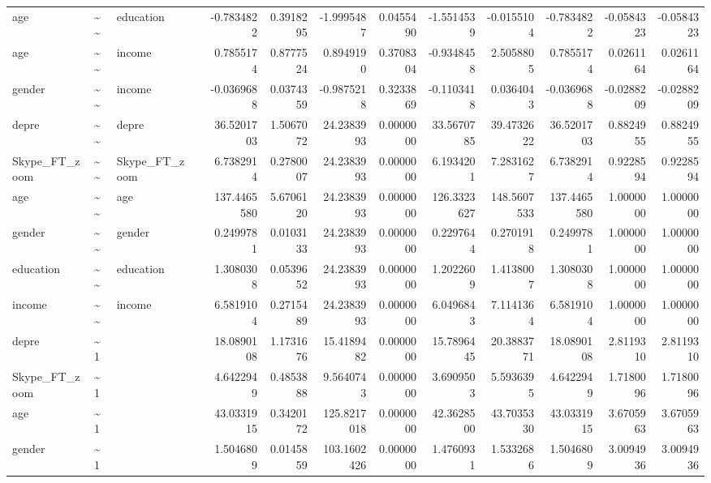 \documentclass[
]{article}
\begin{document}
\begin{table}[!h]
\begin{tabular}[t]{llllrrrrrrrrr}
age & \textasciitilde{}\textasciitilde{} & education &  & -0.7834822 & 0.3918295 & -1.9995487 & 0.0455490 & -1.5514539 & -0.0155104 & -0.7834822 & -0.0584323 & -0.0584323\\
age & \textasciitilde{}\textasciitilde{} & income &  & 0.7855174 & 0.8777524 & 0.8949190 & 0.3708304 & -0.9348458 & 2.5058805 & 0.7855174 & 0.0261164 & 0.0261164\\
gender & \textasciitilde{}\textasciitilde{} & income &  & -0.0369688 & 0.0374359 & -0.9875218 & 0.3233869 & -0.1103418 & 0.0364043 & -0.0369688 & -0.0288209 & -0.0288209\\
\addlinespace
depre & \textasciitilde{}\textasciitilde{} & depre &  & 36.5201703 & 1.5067072 & 24.2383993 & 0.0000000 & 33.5670785 & 39.4732622 & 36.5201703 & 0.8824955 & 0.8824955\\
Skype\_FT\_zoom & \textasciitilde{}\textasciitilde{} & Skype\_FT\_zoom &  & 6.7382914 & 0.2780007 & 24.2383993 & 0.0000000 & 6.1934201 & 7.2831627 & 6.7382914 & 0.9228594 & 0.9228594\\
age & \textasciitilde{}\textasciitilde{} & age &  & 137.4465580 & 5.6706120 & 24.2383993 & 0.0000000 & 126.3323627 & 148.5607533 & 137.4465580 & 1.0000000 & 1.0000000\\
gender & \textasciitilde{}\textasciitilde{} & gender &  & 0.2499781 & 0.0103133 & 24.2383993 & 0.0000000 & 0.2297644 & 0.2701918 & 0.2499781 & 1.0000000 & 1.0000000\\
education & \textasciitilde{}\textasciitilde{} & education &  & 1.3080308 & 0.0539652 & 24.2383993 & 0.0000000 & 1.2022609 & 1.4138007 & 1.3080308 & 1.0000000 & 1.0000000\\
\addlinespace
income & \textasciitilde{}\textasciitilde{} & income &  & 6.5819104 & 0.2715489 & 24.2383993 & 0.0000000 & 6.0496843 & 7.1141364 & 6.5819104 & 1.0000000 & 1.0000000\\
depre & \textasciitilde{}1 &  &  & 18.0890108 & 1.1731676 & 15.4189482 & 0.0000000 & 15.7896445 & 20.3883771 & 18.0890108 & 2.8119310 & 2.8119310\\
Skype\_FT\_zoom & \textasciitilde{}1 &  &  & 4.6422949 & 0.4853888 & 9.5640743 & 0.0000000 & 3.6909503 & 5.5936395 & 4.6422949 & 1.7180096 & 1.7180096\\
age & \textasciitilde{}1 &  &  & 43.0331915 & 0.3420172 & 125.8217018 & 0.0000000 & 42.3628500 & 43.7035330 & 43.0331915 & 3.6705963 & 3.6705963\\
gender & \textasciitilde{}1 &  &  & 1.5046809 & 0.0145859 & 103.1602426 & 0.0000000 & 1.4760931 & 1.5332686 & 1.5046809 & 3.0094936 & 3.0094936\\

\end{tabular}
\end{table}
\end{document}
